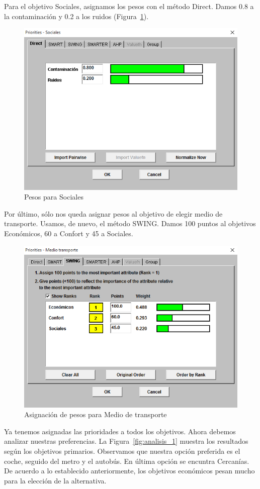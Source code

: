 \documentclass[12pt,a4paper,twoside,openright,titlepage,final]{article}
\begin{document}
Para el objetivo Sociales, asignamos los pesos con el método Direct. Damos 0.8 a la contaminación y 0.2 a los ruidos (Figura~\ref{fig:prioridades_sociales}).\\

\begin{figure}[htbp!]
\centering
\includegraphics[width=0.5\linewidth]{imagenes/prioridades_sociales}
\caption{Pesos para Sociales} \label{fig:prioridades_sociales}
\end{figure}

Por último, sólo nos queda asignar pesos al objetivo de elegir medio de transporte. Usamos, de nuevo, el método SWING. Damos 100 puntos al objetivos Económicos, 60 a Confort y 45 a Sociales.\\

\begin{figure}[htbp!]
\centering
\includegraphics[width=0.5\linewidth]{imagenes/prioridades_medio_transporte}
\caption{Asignación de pesos para Medio de transporte} \label{fig:prioridades_medio_transporte}
\end{figure}

Ya tenemos asignadas las prioridades a todos los objetivos. Ahora debemos analizar nuestras preferencias. La Figura~\ref{fig:analisis_1} muestra los resultados según los objetivos primarios. Observamos que nuestra opción preferida es el coche, seguido del metro y el autobús. En última opción se encuntra Cercanías. De acuerdo a lo establecido anteriormente, los objetivos económicos pesan mucho para la elección de la alternativa.\\
\end{document}
